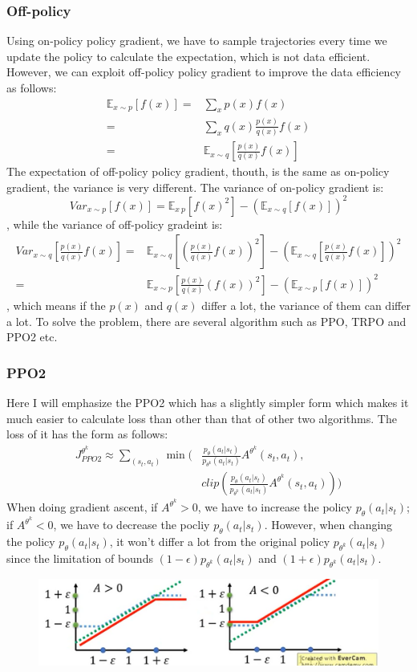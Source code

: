 \documentclass[UTF8, a4paper, 11pt]{article}
\begin{document}
\subsubsection{Off-policy}
Using on-policy policy gradient, we have to sample trajectories every time we update the policy to calculate the expectation, which is not data efficient. However,
we can exploit off-policy policy gradient to improve the data efficiency as follows:
$$\begin{aligned}
\mathbb{E}_{x\sim p}[f(x)]=&\sum_x p(x)f(x)\\
=&\sum_x q(x)\frac{p(x)}{q(x)}f(x)\\
=&\mathbb{E}_{x\sim q}[\frac{p(x)}{q(x)}f(x)]
\end{aligned}$$
The expectation of off-policy policy gradient, thouth, is the same as on-policy gradient, the variance is very different. The variance of on-policy gradient is:
$$Var_{x\sim p}[f(x)]=\mathbb{E}_{x~p}[f(x)^2]-(\mathbb{E}_{x\sim q}[f(x)])^2$$
, while the variance of off-policy gradeint is:
$$\begin{aligned}
Var_{x\sim q}[\frac{p(x)}{q(x)}f(x)]=&\mathbb{E}_{x\sim q}[(\frac{p(x)}{q(x)}f(x))^2]-(\mathbb{E}_{x\sim q}[\frac{p(x)}{q(x)}f(x)])^2\\
=&\mathbb{E}_{x\sim p}[\frac{p(x)}{q(x)}(f(x))^2]-(\mathbb{E}_{x\sim p}[f(x)])^2
\end{aligned}$$
, which means if the $p(x)$ and $q(x)$ differ a lot, the variance of them can differ a lot. To solve the problem, there are several algorithm such as PPO, TRPO and
PPO2 etc.
\subsubsection{PPO2}
Here I will emphasize the PPO2 which has a slightly simpler form which makes it much easier to calculate loss than other than that of other two algorithms. The loss
of it has the form as follows:
$$\begin{aligned}
J_{PPO2}^{\theta^k}\approx\sum_{(s_t,a_t)}\min(&\frac{p_\theta(a_t|s_t)}{p_{\theta^k}(a_t|s_t)}A^{\theta^k}(s_t,a_t),\\
&clip(\frac{p_\theta(a_t|s_t)}{p_{\theta^k}(a_t|s_t)}A^{\theta^k}(s_t,a_t)))
\end{aligned}$$
When doing gradient ascent, if $A^{\theta^k}>0$, we have to increase the policy $p_{\theta}(a_t|s_t)$; if $A^{\theta^k}<0$, we have to decrease the pocliy
$p_{\theta}(a_t|s_t)$. However, when changing the policy $p_{\theta}(a_t|s_t)$, it won't differ a lot from the original policy $p_{\theta^k}(a_t|s_t)$ since the
limitation of bounds $(1-\epsilon)p_{\theta^k}(a_t|s_t)$ and $(1+\epsilon)p_{\theta^k}(a_t|s_t)$.
\begin{figure}[H]
    \centering
    \includegraphics[width = \textwidth]{PPO2.png}
\end{figure}
\end{document}
